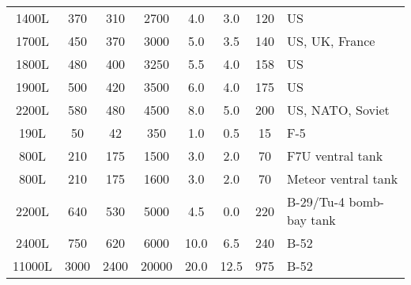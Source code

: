 \begin{twocolumntablefloat}
\begin{twocolumntable}
{\begin{tabular}{cccccccl}
\phantom{0}1400L&\phantom{0}370&\phantom{0}310&\phantom{0}2700&\phantom{0}4.0&\phantom{0}3.0&\phantom{}120&US\\
\phantom{0}1700L&\phantom{0}450&\phantom{0}370&\phantom{0}3000&\phantom{0}5.0&\phantom{0}3.5&\phantom{}140&US, UK, France\\
\phantom{0}1800L&\phantom{0}480&\phantom{0}400&\phantom{0}3250&\phantom{0}5.5&\phantom{0}4.0&\phantom{}158&US\\
\phantom{0}1900L&\phantom{0}500&\phantom{0}420&\phantom{0}3500&\phantom{0}6.0&\phantom{0}4.0&\phantom{}175&US\\
\phantom{0}2200L&\phantom{0}580&\phantom{0}480&\phantom{0}4500&\phantom{0}8.0&\phantom{0}5.0&\phantom{}200&US, NATO, Soviet\\
\midrule
\phantom{00}190L&\phantom{00}50&\phantom{00}42&\phantom{00}350&\phantom{0}1.0&\phantom{0}0.5&\phantom{0}15&F-5\\
\phantom{00}800L&\phantom{0}210&\phantom{0}175&\phantom{0}1500&\phantom{0}3.0&\phantom{0}2.0&\phantom{0}70&F7U ventral tank\\
\phantom{00}800L&\phantom{0}210&\phantom{0}175&\phantom{0}1600&\phantom{0}3.0&\phantom{0}2.0&\phantom{0}70&Meteor ventral tank\\
\phantom{0}2200L&\phantom{0}640&\phantom{0}530&\phantom{0}5000&\phantom{0}4.5&\phantom{0}0.0&\phantom{0}220&B-29/Tu-4 bomb-bay tank\\
\phantom{0}2400L&\phantom{0}750&\phantom{0}620&\phantom{0}6000&\phantom{}10.0&\phantom{0}6.5&\phantom{0}240&B-52\\
\phantom{}11000L&\phantom{}3000&\phantom{}2400&\phantom{}20000&\phantom{}20.0&12.5&\phantom{0}975&B-52\\
\bottomrule
\end{tabular}

}
\end{twocolumntable}
\end{twocolumntablefloat}